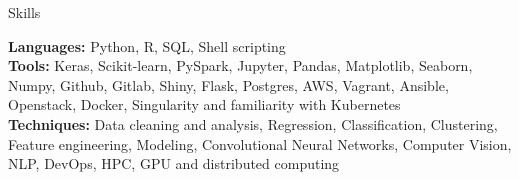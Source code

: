 \documentclass{resume} %
\begin{document}
  


\begin{rSection}{Skills} \itemsep -3pt  

{\textbf{Languages:} Python, R, SQL, Shell scripting}  \\
{\textbf{Tools:} Keras, Scikit-learn, PySpark, Jupyter, Pandas, Matplotlib, Seaborn, Numpy, Github, Gitlab, Shiny, Flask, Postgres, AWS, Vagrant, Ansible, Openstack, Docker, Singularity and familiarity with Kubernetes} \\
{\textbf{Techniques:} Data cleaning and analysis, Regression, Classification, Clustering, Feature engineering, Modeling, Convolutional Neural Networks, Computer Vision, NLP, DevOps, HPC, GPU and distributed computing}
\end{rSection}  
 
\end{document}
